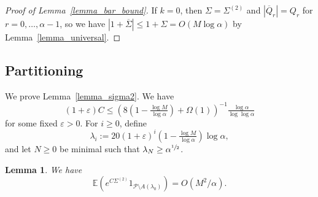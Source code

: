 \documentclass{article}
\theoremstyle{plain}
\theoremstyle{remark}
\theoremstyle{plain}
\newtheorem{lemma}[theorem]{Lemma}
\numberwithin{equation}{section}
\begin{document}
	\begin{proof}[Proof of Lemma~\ref{lemma_bar_bound}]
		If $k=0$, then $\Sigma=\Sigma^{(2)}$ and $|\overline{Q}_r|=Q_r$ for $r=0,\ldots,\alpha-1$, so we have $|1+\overline{\Sigma}|\leq1+\Sigma=O(M\log\alpha)$ by Lemma~\ref{lemma_universal}.
	\end{proof}
	
	\subsection{Partitioning}\label{subsection_proof_partition}
	
	We prove Lemma~\ref{lemma_sigma2}. We have $$(1+\varepsilon)C\leq\left(8\left(1-\tfrac{\log M}{\log\alpha}\right)+\Omega(1)\right)^{-1}\tfrac{\log\alpha}{\log\log\alpha}$$ for some fixed $\varepsilon>0$. For $i\geq0$, define $$\lambda_i:=20(1+\varepsilon)^i\left(1-\tfrac{\log M}{\log\alpha}\right)\log\alpha,$$ and let $N\geq0$ be minimal such that $\lambda_N\geq\alpha^{\sfrac12}$.
	
	\begin{lemma}\label{lemma_an}
		We have $$\mathbb{E}(e^{C\Sigma^{(2)}}1_{\mathcal{P}\setminus A(\lambda_0)})=O(M^2/\alpha).$$
	\end{lemma}
	
\end{document}
